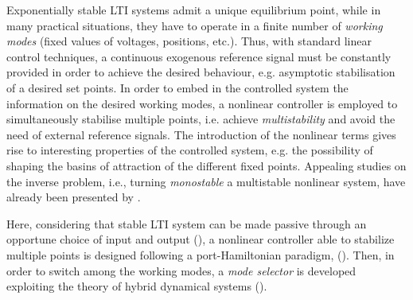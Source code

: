 Exponentially stable LTI systems admit a unique equilibrium point, while in many practical situations, they have to operate in a finite number of \textit{working modes} (fixed values of voltages, positions, etc.).
Thus, with standard linear control techniques, a continuous exogenous reference signal must be constantly provided in order to achieve the desired behaviour, e.g. asymptotic stabilisation of a desired set points.
%
In order to embed in the controlled system the information on the desired working modes, a nonlinear controller is employed to simultaneously stabilise multiple points, i.e. achieve \textit{multistability} and avoid the need of external reference signals.
The introduction of the nonlinear terms gives rise to interesting properties of the controlled system, e.g. the possibility of shaping the basins of attraction of the different fixed points.
Appealing studies on the inverse problem, i.e., turning \textit{monostable} a {multistable} nonlinear system, have already been presented by \cite{PISARCHIK2014167}.

%
Here, considering that stable LTI system can be made passive through an opportune choice of input and output (\cite{byrnes91}), a nonlinear controller able to stabilize multiple points is designed following a port-Hamiltonian paradigm, (\cite{876703,secchi2007control,ortega2008control,van2014port}). Then, in order to switch among the working modes, a \textit{mode selector} is developed exploiting the theory of hybrid dynamical systems (\cite{van2000introduction,goebel2008}).

